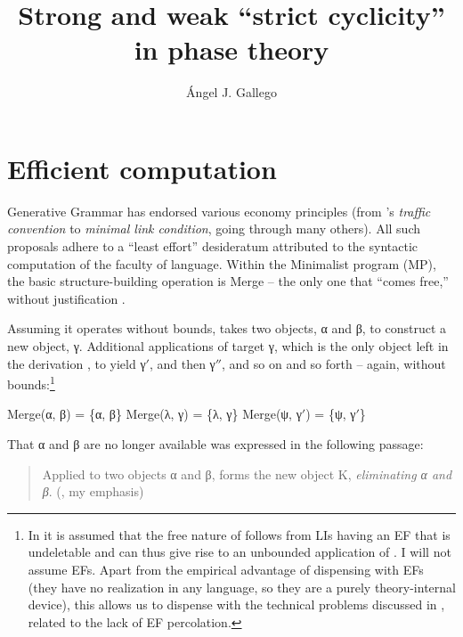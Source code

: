 \documentclass[output=paper]{langsci/langscibook}
\author{Ángel J. Gallego\affiliation{Universitat Autònoma de Barcelona}}
\title{Strong and weak \enquote{strict cyclicity} in phase theory}
\begin{document}
\glsresetall

\section{Efficient computation}

Generative Grammar has endorsed various economy principles (from
\citeauthor{Chomsky1955}’s \citeyear{Chomsky1955} \emph{traffic convention}
to  \emph{minimal link condition}, going through many
others).  All such proposals adhere to a “least effort” desideratum attributed
to the syntactic computation of the faculty of language.  Within the Minimalist
program (\gls{MP}), the basic structure-building operation is
Merge -- the only one that “comes free,” without justification
\parencites[3]{Chomsky2001}[137]{Chomsky2008}.

\largerpage
Assuming it operates without bounds,  takes two objects, α and β, to
construct a new object, γ. Additional applications of  target γ, which is
the only object left in the derivation \citep[243]{Chomsky1995}, to yield γ$'$,
and then γ$''$, and so on and so forth -- again, without bounds:\footnote{In
    \textcites[11]{Chomsky2007}[139]{Chomsky2008} it is assumed that the free
    nature of  follows from LIs having an \textsc{\gls{EF}} that is
    undeletable and can thus give rise to an unbounded application of
    .  I will not assume \glspl{EF}. Apart from the empirical
    advantage of dispensing with \glspl{EF} (they have no realization in any
    language, so they are a purely theory-internal device), this allows us to
    dispense with the technical problems discussed in \citet{Narita2014},
    related to the lack of \gls{EF} percolation.}

\ea%
    \label{ex:34.1}
    \ea Merge(α, β) = \{α, β\}
    \ex Merge(λ, γ) = \{λ, γ\}
    \ex Merge(ψ, γ$'$) = \{ψ, γ$'$\}
    \z
\z

That α and β are no longer available was expressed in the following passage:

\begin{quote}
Applied to two objects α and β,  forms the new object K,
\emph{eliminating α and β}. (\citealt[243]{Chomsky1995}, my emphasis)\end{quote}
\end{document}
